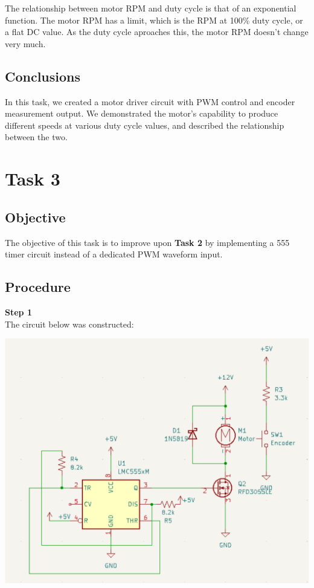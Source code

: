 \documentclass[notitlepage, 12pt]{report}  %
\begin{document}
The relationship between motor RPM and duty cycle is that of an exponential function. The motor RPM has a limit, which is the RPM at 
100\% duty cycle, or a flat DC value. As the duty cycle aproaches this, the motor RPM doesn't change very much. \\

\subsection*{Conclusions}

\indent\indent In this task, we created a motor driver circuit with PWM control and encoder measurement output. 
We demonstrated the motor's capability to produce different speeds at various duty cycle values, and described the relationship between the two.\\

\newpage

\section*{Task 3}

\subsection*{Objective}
\indent\indent The objective of this task is to improve upon \textbf{Task 2} by implementing a 555 timer circuit
instead of a dedicated PWM waveform input. \\

\subsection*{Procedure}

\indent\indent \textbf{Step 1}\\

The circuit below was constructed:

\begin{center}
    \includegraphics[scale=0.2]{task3.png}
\end{center}
\end{document}
